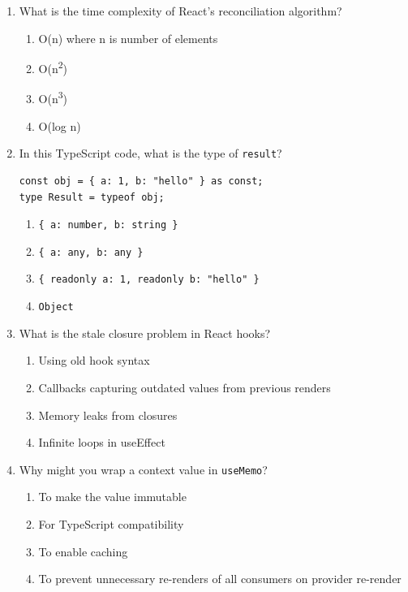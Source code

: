 \documentclass[12pt,a4paper]{article}
\begin{document}
\begin{enumerate}
\item What is the time complexity of React's reconciliation algorithm?
\begin{enumerate}[label=\Alph*)]
    \item O(n) where n is number of elements
    \item O(n\textsuperscript{2})
    \item O(n\textsuperscript{3})
    \item O(log n)
\end{enumerate}

\item In this TypeScript code, what is the type of \texttt{result}?
\begin{verbatim}
const obj = { a: 1, b: "hello" } as const;
type Result = typeof obj;
\end{verbatim}
\begin{enumerate}[label=\Alph*)]
    \item \texttt{\{ a: number, b: string \}}
    \item \texttt{\{ a: any, b: any \}}
    \item \texttt{\{ readonly a: 1, readonly b: "hello" \}}
    \item \texttt{Object}
\end{enumerate}

\item What is the stale closure problem in React hooks?
\begin{enumerate}[label=\Alph*)]
    \item Using old hook syntax
    \item Callbacks capturing outdated values from previous renders
    \item Memory leaks from closures
    \item Infinite loops in useEffect
\end{enumerate}

\item Why might you wrap a context value in \texttt{useMemo}?
\begin{enumerate}[label=\Alph*)]
    \item To make the value immutable
    \item For TypeScript compatibility
    \item To enable caching
    \item To prevent unnecessary re-renders of all consumers on provider re-render
\end{enumerate}


\end{enumerate}
\end{document}
